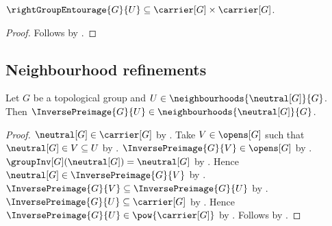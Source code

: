 \begin{proposition}\label{right_group_entourage_type}
    $\rightGroupEntourage{G}{U}
        \subseteq\carrier[G]\times\carrier[G]$.
\end{proposition}
\begin{proof}
    Follows by .
\end{proof}

\subsection{Neighbourhood refinements}

\begin{proposition}\label{topological_group_inverse_identity_neighbourhood}
    Let $G$ be a topological group and
        $U\in\neighbourhoods{\neutral[G]}{G}$.
    Then $\InversePreimage{G}{U}
        \in\neighbourhoods{\neutral[G]}{G}$.
\end{proposition}
\begin{proof}
    $\neutral[G]\in\carrier[G]$ by .
    Take $V\in\opens[G]$ such that
        $\neutral[G]\in V\subseteq U$ by .
    $\InversePreimage{G}{V}\in\opens[G]$
        by .
    $\groupInv[G](\neutral[G])=\neutral[G]$
        by .
    Hence $\neutral[G]\in\InversePreimage{G}{V}$
        by .
    $\InversePreimage{G}{V}\subseteq\InversePreimage{G}{U}$
        by .
    $\InversePreimage{G}{U}\subseteq\carrier[G]$
        by .
    Hence $\InversePreimage{G}{U}\in\pow{\carrier[G]}$
        by .
    Follows by .
\end{proof}

